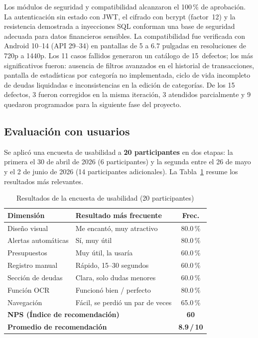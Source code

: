 \documentclass[10pt,twocolumn,letterpaper]{article}
\begin{document}
Los módulos de seguridad y compatibilidad alcanzaron el 100\,\% de aprobación. La autenticación
sin estado con JWT, el cifrado con bcrypt (factor~12) y la resistencia demostrada a inyecciones
SQL conforman una base de seguridad adecuada para datos financieros sensibles. La compatibilidad
fue verificada con Android 10--14 (API 29--34) en pantallas de 5 a 6.7 pulgadas en resoluciones
de 720p a 1440p. Los 11 casos fallidos generaron un catálogo de 15~defectos; los más
significativos fueron: ausencia de filtros avanzados en el historial de transacciones, pantalla
de estadísticas por categoría no implementada, ciclo de vida incompleto de deudas liquidadas e
inconsistencias en la edición de categorías. De los 15 defectos, 3 fueron corregidos en la misma
iteración, 3 atendidos parcialmente y 9 quedaron programados para la siguiente fase del proyecto.

\subsection{Evaluación con usuarios}

Se aplicó una encuesta de usabilidad a \textbf{20 participantes} en dos etapas: la primera el
30 de abril de 2026 (6 participantes) y la segunda entre el 26 de mayo y el 2 de junio de 2026
(14 participantes adicionales). La Tabla~\ref{tab:encuesta} resume los resultados más relevantes.

\begin{table}[H]
  \centering
  \small
  \caption{Resultados de la encuesta de usabilidad (20 participantes)}
  \label{tab:encuesta}
  \renewcommand{\arraystretch}{1.15}
  \begin{tabular}{p{2.6cm}p{3.0cm}c}
    \toprule
    \textbf{Dimensión} & \textbf{Resultado más frecuente} & \textbf{Frec.} \\
    \midrule
    Diseño visual        & Me encantó, muy atractivo         & 80.0\,\% \\
    Alertas automáticas  & Sí, muy útil                      & 80.0\,\% \\
    Presupuestos         & Muy útil, la usaría               & 60.0\,\% \\
    Registro manual      & Rápido, 15--30 segundos           & 60.0\,\% \\
    Sección de deudas    & Clara, solo dudas menores         & 60.0\,\% \\
    Función OCR          & Funcionó bien / perfecto          & 80.0\,\% \\
    Navegación           & Fácil, se perdió un par de veces  & 65.0\,\% \\
    \midrule
    \multicolumn{2}{l}{\textbf{NPS (Índice de recomendación)}} & \textbf{60} \\
    \multicolumn{2}{l}{\textbf{Promedio de recomendación}} & \textbf{8.9\,/\,10} \\
    \bottomrule
  \end{tabular}
\end{table}
\end{document}
